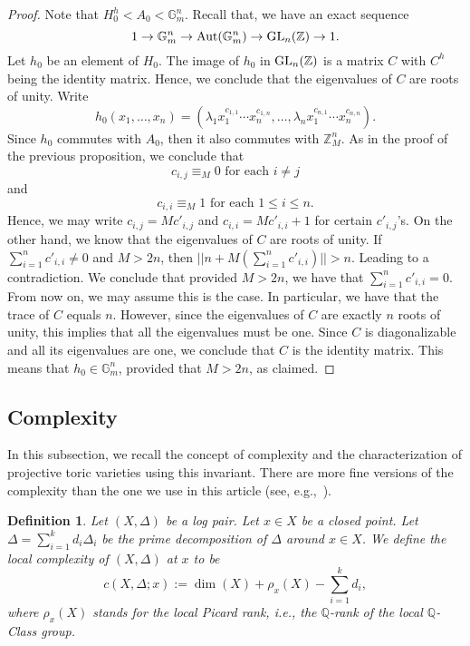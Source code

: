 \documentclass{amsart}
\renewcommand{\qq}{\mathbb{Q}}
\newcommand{\zz}{\mathbb{Z}}
\newtheorem{definition}[theorem]{Definition}
\theoremstyle{remark}
\numberwithin{equation}{section}
\begin{document}
\begin{proof}
Note that $H_0^h < A_0 < \mathbb{G}_m^n$.
Recall that, we have an exact sequence
\[
1\rightarrow \mathbb{G}_m^n
\rightarrow {\rm Aut}(\mathbb{G}_m^n)
\rightarrow {\rm GL}_n(\zz)
\rightarrow 1.
\]
Let $h_0$ be an element of $H_0$.
The image of $h_0$ in ${\rm GL}_n(\zz)$ is a matrix 
$C$ with $C^h$ being the identity matrix.
Hence, we conclude that the eigenvalues of $C$ are roots of unity.
Write
\[
h_0(x_1,\dots,x_n)=
(\lambda_1 x_1^{c_{1,1}}\cdots x_n^{c_{1,n}}, \dots ,
\lambda_n 
x_1^{c_{n,1}}\cdots x_n^{c_{n,n}}).
\]
Since $h_0$ commutes with $A_0$, then
it also commutes with $\zz_M^n$.
As in the proof of the previous proposition, we conclude that 
\[
c_{i,j}\equiv_M 0 \text{ for each $i\neq j$}
\]
and 
\[
c_{i,i}\equiv_M 1 \text{ for each $1\leq i\leq n$.}
\]
Hence, we may write 
$c_{i,j}=Mc'_{i,j}$
and $c_{i,i}=Mc'_{i,i}+1$
for certain $c'_{i,j}$'s.
On the other hand, we know that the eigenvalues of $C$ are 
roots of unity.
If $\sum_{i=1}^n c'_{i,i}\neq 0$
and $M>2n$, 
then $||n+M(\sum_{i=1}^n c'_{i,i})||>n$.
Leading to a contradiction.
We conclude that
provided $M>2n$,
we have that $\sum_{i=1}^n c'_{i,i}=0$.
From now on, we may assume this is the case.
In particular, we have that the trace of $C$ equals $n$.
However, since the eigenvalues of $C$ are exactly $n$
roots of unity,
this implies that all the eigenvalues must be one.
Since $C$ is diagonalizable and all its eigenvalues are one,
we conclude that $C$ is the identity matrix.
This means that $h_0 \in \mathbb{G}_m^n$, provided that $M>2n$, as claimed.
\end{proof}

\subsection{Complexity}\label{subsec:complexity}
In this subsection, we recall the concept of complexity
and the characterization of projective toric varieties using this invariant.
There are more fine versions of the complexity than the one we use in this article (see, e.g.,~\cite{BMSZ18}).

\begin{definition}{\em  
Let $(X,\Delta)$ be a log pair.
Let $x\in X$ be a closed point.
Let $\Delta=\sum_{i=1}^k d_i\Delta_i$ be the prime decomposition
of $\Delta$ around $x\in X$.
We define the {\em local complexity} of $(X,\Delta)$ at $x$ to be
\[
c(X,\Delta;x):=\dim(X)+\rho_x(X)-\sum_{i=1}^k d_i,
\]
where $\rho_x(X)$ stands for the local Picard rank, i.e., the $\qq$-rank of the local $\qq$-Class group.
}
\end{definition}
\end{document}
